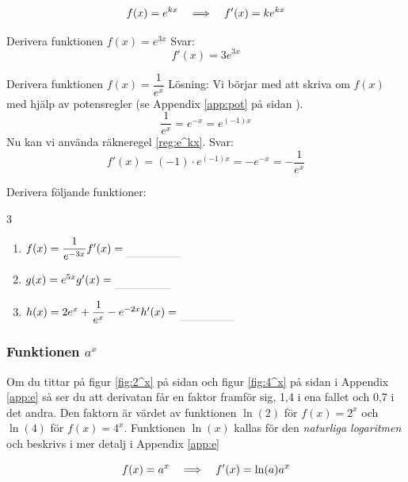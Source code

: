 \documentclass[a4paper, 12pt]{article}
\begin{document}
\begin{regel}
    \label{reg:e^kx}
    \[ f(x) = e^{kx} \hspace{1em} \Longrightarrow \hspace{1em} f'(x) = ke^{kx} \]
\end{regel}


\begin{exempel}
    Derivera funktionen $f(x) = e^{3x}$
    \dinkus
    Svar: \[f'(x) = 3e^{3x}\]
\end{exempel}


\begin{exempel}
    Derivera funktionen $f(x) = \dfrac 1{e^x}$
     \dinkus
    Lösning: Vi börjar med att skriva om $f(x)$ med hjälp av potensregler (se Appendix \ref*{app:pot} på sidan \pageref*{app:pot}). 
    \[ \frac 1{e^x} = e^{-x} = e^{(-1)x} \]
    Nu kan vi använda räkneregel \ref*{reg:e^kx}.
    Svar: \[f'(x) = (-1)\cdot e^{(-1)x} = -e^{-x} = -\dfrac 1{e^x}\]
\end{exempel}


\begin{uppgifter}
    \label{upp:e^kx}
    Derivera följande funktioner:
    \begin{multicols}{3}
        \begin{enumerate}
            \item $f(x) = \dfrac{1}{e^{-3x}} \\ f'(x) \ans$
            \item $g(x) = e^{5x} \\ g'(x) \ans$
            \item $h(x) = 2e^x + \dfrac 1{e^x} - e^{-2x} \\ h'(x) \ans$
        \end{enumerate}
    \end{multicols}
\end{uppgifter}

\subsubsection{Funktionen $a^x$}
Om du tittar på figur \ref*{fig:2^x} på sidan \pageref*{fig:2^x} och figur \ref*{fig:4^x} på sidan \pageref*{fig:4^x} i Appendix \ref*{app:e} så ser du att derivatan får en faktor framför sig, 1,4 i ena fallet och 0,7 i det andra. Den faktorn är värdet av funktionen $\ln(2)$ för $f(x) = 2^x$ och $\ln(4)$ för $f(x) = 4^x$. Funktionen $\ln (x)$ kallas för den \emph{naturliga logaritmen} och beskrivs i mer detalj i Appendix \ref*{app:e}


\begin{regel}
    \label{reg:a^x}
    \[f(x) = a^x \hspace{1em} \Longrightarrow \hspace{1em} f'(x) = \ln (a) a^x \]
\end{regel}
\end{document}
